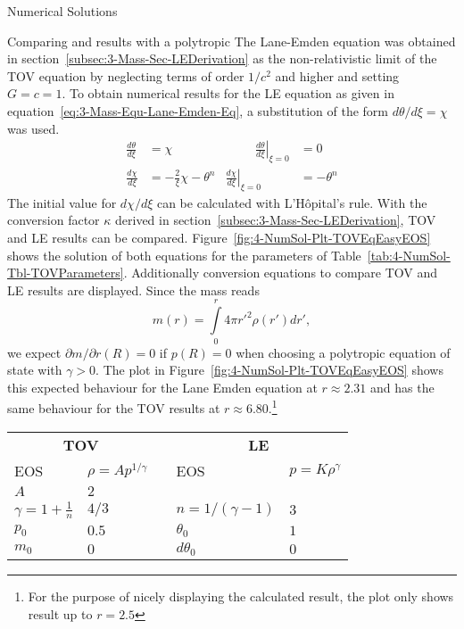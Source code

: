 \begin{section}{Numerical Solutions}
\begin{subsection}{Comparing \texorpdfstring{}{TOV} and \texorpdfstring{}{LE} results with a polytropic \texorpdfstring{}{EoS}}
The Lane-Emden equation was obtained in section~\ref{subsec:3-Mass-Sec-LEDerivation} as the non-relativistic limit of the \ac{TOV} equation by neglecting terms of order $1/c^2$ and higher and setting $G=c=1$.
To obtain numerical results for the \ac{LE} equation as given in equation~\eqref{eq:3-Mass-Equ-Lane-Emden-Eq}, a substitution of the form $d\theta/d\xi=\chi$ was used.
\begin{equation}
	\begin{aligned}
		\frac{d\theta}{d\xi} &= \chi &\hspace{1cm} \left.\frac{d\theta}{d\xi}\right|_{\xi=0} &= 0\\
		\frac{d\chi}{d\xi} &= -\frac{2}{\xi}\chi-\theta^n & \left.\frac{d\chi}{d\xi}\right|_{\xi=0} &= -\theta^n
		\label{eq:4-NumSol-Equ-LE-Substitution}
	\end{aligned}
\end{equation}
The initial value for $d\chi/d\xi$ can be calculated with L'Hôpital's rule.
With the conversion factor $\kappa$ derived in section~\ref{subsec:3-Mass-Sec-LEDerivation}, \ac{TOV} and \ac{LE} results can be compared.
Figure~\ref{fig:4-NumSol-Plt-TOVEqEasyEOS} shows the solution of both equations for the parameters of Table~\ref{tab:4-NumSol-Tbl-TOVParameters}.
Additionally conversion equations to compare \ac{TOV} and \ac{LE} results are displayed.
Since the mass reads
\[
	m(r) = \int\limits_0^r 4\pi r'^2\rho(r')dr',
\]
we expect $\partial m/\partial r(R)=0$ if $p(R)=0$ when choosing a polytropic equation of state with $\gamma>0$.
The plot in Figure~\ref{fig:4-NumSol-Plt-TOVEqEasyEOS} shows this expected behaviour for the Lane Emden equation at $r\approx2.31$ and has the same behaviour for the \ac{TOV} results at $r\approx6.80$.\footnote{For the purpose of nicely displaying the calculated result, the plot only shows result up to $r=2.5$}
\begin{table}[H]
	{\renewcommand{\arraystretch}{1.2}
	\centering
	\begin{tabular}{@{}llcll@{}}
		\toprule
		\multicolumn{2}{c}{\textbf{TOV}} & \phantom{b} &\multicolumn{2}{c}{\textbf{LE}}\\
		\cmidrule{1-2} \cmidrule{4-5}
		EOS & $\rho=Ap^{1/\gamma}$ && EOS & $p=K\rho^{\gamma}$\\
		$A$ & $2$ & & \\
		$\gamma=1+\frac{1}{n}$ & $4/3$ && $n=1/(\gamma-1)$ & $3$\\
		$p_0$ & $0.5$ && $\theta_0$ & $1$\\
		$m_0$ & $0$ && $d\theta_0$ & $0$\\

\end{tabular}}
\end{table}
\end{subsection}
\end{section}
